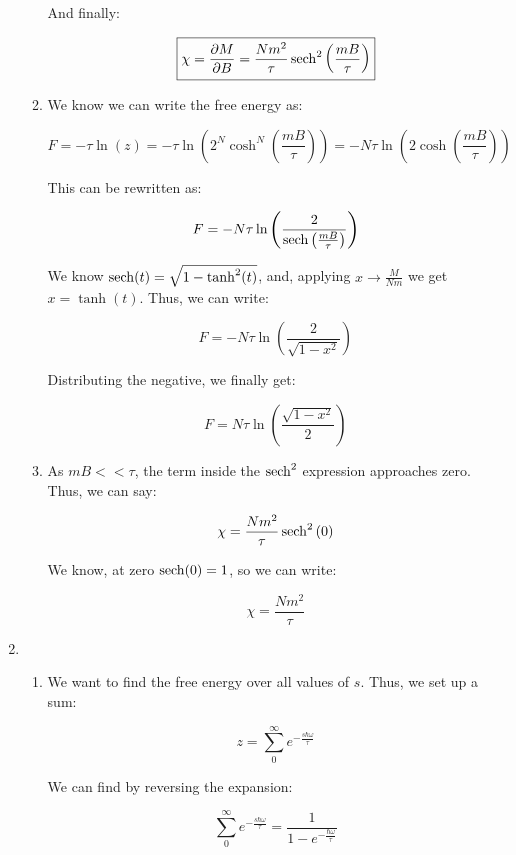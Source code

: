 \begin{enumerate}
\begin{enumerate}
        And finally:

        $$\boxed{\chi=\frac{\partial M}{\partial B}=\frac{Nm^2}{\tau}\sech^2\left( \frac{mB}{\tau} \right)}$$

      \item 

        We know we can write the free energy as:

        $$F=-\tau\ln(z)=-\tau\ln\left( 2^N\cosh^N\left( \frac{mB}{\tau} \right) \right)=-N\tau \ln\left( 2\cosh\left( \frac{mB}{\tau} \right) \right) $$

        This can be rewritten as:

        $$F=-N\tau \ln\left( \frac{2}{\sech\left( \frac{mB}{\tau} \right)} \right) $$

        We know $\sech(t)=\sqrt{1-\tanh^2(t)}$, and, applying $x\rightarrow\frac{M}{Nm}$ we get $x=\tanh(t)$. Thus, we can write:

        $$F=-N\tau \ln\left( \frac{2}{\sqrt{1-x^2}} \right) $$

        Distributing the negative, we finally get:

        $$\boxed{F=N\tau\ln\left( \frac{\sqrt{1-x^2}}{2} \right)}$$

      \item 

        As $mB<<\tau$, the term inside the $\sech^2$ expression approaches zero. Thus, we can say:

        $$\chi=\frac{Nm^2}{\tau}\sech^2\left( 0\right)$$

        We know, at zero $\sech(0)=1$, so we can write:

        $$\boxed{\chi=\frac{Nm^2}{\tau}}$$

    \end{enumerate}

  \item 

    \begin{enumerate}

      \item 

        We want to find the free energy over all values of $s$. Thus, we set up a sum:

        $$z=\sum_0^{\infty}e^{-\frac{s\hbar\omega}{\tau}}$$

        We can find by reversing the expansion:

        $$\sum_0^{\infty}e^{-\frac{s\hbar\omega}{\tau}}=\frac{1}{1-e^{-\frac{\hbar\omega}{\tau}}}$$


\end{enumerate}
\end{enumerate}
